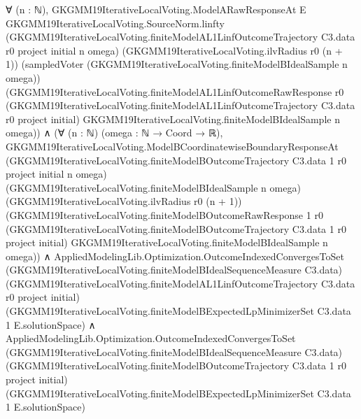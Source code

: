 \documentclass[10pt]{article}
\begin{document}
\begin{ReviewVerbatim}
                              ∀ (n : ℕ),
                                GKGMM19IterativeLocalVoting.ModelARawResponseAt E
                                  GKGMM19IterativeLocalVoting.SourceNorm.linfty
                                  (GKGMM19IterativeLocalVoting.finiteModelAL1LinfOutcomeTrajectory C3.data r0 project
                                    initial n omega)
                                  (GKGMM19IterativeLocalVoting.ilvRadius r0 (n + 1))
                                  (sampledVoter (GKGMM19IterativeLocalVoting.finiteModelBIdealSample n omega))
                                  (GKGMM19IterativeLocalVoting.finiteModelAL1LinfOutcomeRawResponse r0
                                    (GKGMM19IterativeLocalVoting.finiteModelAL1LinfOutcomeTrajectory C3.data r0 project
                                      initial)
                                    GKGMM19IterativeLocalVoting.finiteModelBIdealSample n omega)) ∧
                        (∀ (n : ℕ) (omega : ℕ → Coord → ℝ),
                            GKGMM19IterativeLocalVoting.ModelBCoordinatewiseBoundaryResponseAt
                              (GKGMM19IterativeLocalVoting.finiteModelBOutcomeTrajectory C3.data 1 r0 project initial n
                                omega)
                              (GKGMM19IterativeLocalVoting.finiteModelBIdealSample n omega)
                              (GKGMM19IterativeLocalVoting.ilvRadius r0 (n + 1))
                              (GKGMM19IterativeLocalVoting.finiteModelBOutcomeRawResponse 1 r0
                                (GKGMM19IterativeLocalVoting.finiteModelBOutcomeTrajectory C3.data 1 r0 project initial)
                                GKGMM19IterativeLocalVoting.finiteModelBIdealSample n omega)) ∧
                          AppliedModelingLib.Optimization.OutcomeIndexedConvergesToSet
                              (GKGMM19IterativeLocalVoting.finiteModelBIdealSequenceMeasure C3.data)
                              (GKGMM19IterativeLocalVoting.finiteModelAL1LinfOutcomeTrajectory C3.data r0 project
                                initial)
                              (GKGMM19IterativeLocalVoting.finiteModelBExpectedLpMinimizerSet C3.data 1
                                E.solutionSpace) ∧
                            AppliedModelingLib.Optimization.OutcomeIndexedConvergesToSet
                              (GKGMM19IterativeLocalVoting.finiteModelBIdealSequenceMeasure C3.data)
                              (GKGMM19IterativeLocalVoting.finiteModelBOutcomeTrajectory C3.data 1 r0 project initial)
                              (GKGMM19IterativeLocalVoting.finiteModelBExpectedLpMinimizerSet C3.data 1 E.solutionSpace)
\end{ReviewVerbatim}
\end{document}
